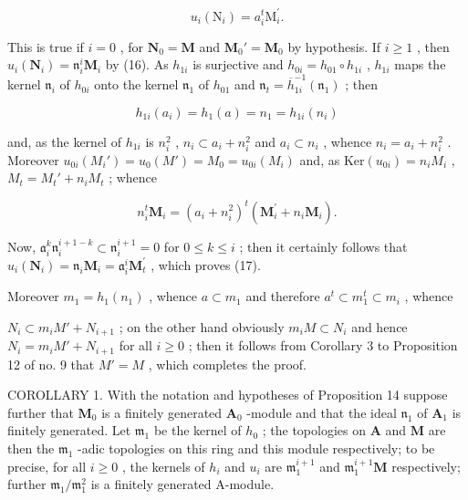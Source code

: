 \[
u _ {i} \left(\mathrm{N} _ {i}\right) = a _ {i} ^ {t} \mathrm{M} _ {i} ^ {\prime}.
\]

This is true if \(i = 0\) , for \(\mathbf{N}_0 = \mathbf{M}\) and \(\mathbf{M}_0' = \mathbf{M}_0\) by hypothesis. If \(i \geqslant 1\) , then \(u_i(\mathbf{N}_i) = \mathfrak{n}_i^i\mathbf{M}_i\) by (16). As \(h_{1i}\) is surjective and \(h_{0i} = h_{01} \circ h_{1i}\) , \(h_{1i}\) maps the kernel \(\mathfrak{n}_i\) of \(h_{0i}\) onto the kernel \(\mathfrak{n}_1\) of \(h_{01}\) and \(\mathfrak{n}_t = \overline{h}_{1i}^{-1}(\mathfrak{n}_1)\) ; then

\[
h _ {1 i} (a _ {i}) = h _ {1} (a) = n _ {1} = h _ {1 i} (n _ {i})
\]

and, as the kernel of \(h_{1i}\) is \(n_i^2\) , \(n_i \subset a_i + n_i^2\) and \(a_i \subset n_i\) , whence \(n_i = a_i + n_i^2\) . Moreover \(u_{0i}(M_i') = u_0(M') = M_0 = u_{0i}(M_i)\) and, as \(\text{Ker}(u_{0i}) = n_iM_i\) , \(M_t = M_t' + n_iM_t\) ; whence

\[
n _ {i} ^ {t} \mathbf {M} _ {i} = (a _ {i} + n _ {i} ^ {2}) ^ {t} (\mathbf {M} _ {i} ^ {\prime} + n _ {i} \mathbf {M} _ {i}).
\]

Now, \(\mathfrak{a}_i^k\mathfrak{n}_i^{i + 1 - k}\subset \mathfrak{n}_i^{i + 1} = 0\) for \(0\leqslant k\leqslant i\) ; then it certainly follows that \(u_{i}(\mathbf{N}_{i}) = \mathfrak{n}_{i}\mathbf{M}_{i} = \mathfrak{a}_{i}^{i}\mathbf{M}_{t}^{\prime}\) , which proves (17).

Moreover \(m_1 = h_1(n_1)\) , whence \(a \subset m_1\) and therefore \(a^t \subset m_1^t \subset m_i\) , whence

\(N_{i} \subset m_{i}M' + N_{i+1}\) ; on the other hand obviously \(m_{i}M \subset N_{i}\) and hence \(N_{i} = m_{i}M' + N_{i+1}\) for all \(i \geqslant 0\) ; then it follows from Corollary 3 to Proposition 12 of no. 9 that \(M' = M\) , which completes the proof.

COROLLARY 1. With the notation and hypotheses of Proposition 14 suppose further that \(\mathbf{M}_0\) is a finitely generated \(\mathbf{A}_0\) -module and that the ideal \(\mathfrak{n}_1\) of \(\mathbf{A}_1\) is finitely generated. Let \(\mathfrak{m}_1\) be the kernel of \(h_0\) ; the topologies on \(\mathbf{A}\) and \(\mathbf{M}\) are then the \(\mathfrak{m}_1\) -adic topologies on this ring and this module respectively; to be precise, for all \(i \geqslant 0\) , the kernels of \(h_i\) and \(u_i\) are \(\mathfrak{m}_1^{i+1}\) and \(\mathfrak{m}_1^{i+1}\mathbf{M}\) respectively; further \(\mathfrak{m}_1/\mathfrak{m}_1^2\) is a finitely generated A-module.

